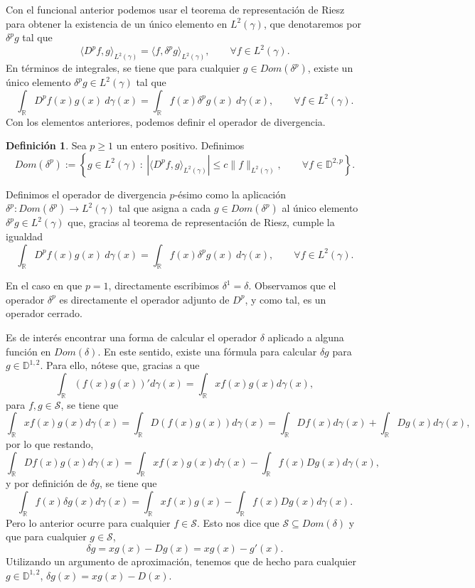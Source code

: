 \documentclass[letterpaper,twoside,12pt]{book}
\newcommand{\R}{\mathbb{R}}
\newcommand{\D}{\mathbb{D}}
\newcommand{\1}{\mathds{1}}
\newcommand{\abs}[1]{\left\lvert #1 \right\rvert}
\theoremstyle{definition}
\newtheorem{dfn}{Definición}
\theoremstyle{definition}
\theoremstyle{definition}
\theoremstyle{definition}
\theoremstyle{definition}
\theoremstyle{definition}
\theoremstyle{definition}
\begin{document}
Con el funcional anterior podemos usar el teorema de representación de Riesz para obtener la existencia de un único elemento en $L^2(\gamma)$, que denotaremos por $\delta^{p}g$ tal que 
\[
\langle D^pf,g\rangle_{L^2(\gamma)}=\langle f,\delta^p g\rangle_{L^2(\gamma)}, \qquad \forall f\in L^2(\gamma).
\]
 En términos de integrales, se tiene que para cualquier $g\in Dom(\delta^p)$, existe un único elemento $\delta^p g\in L^2(\gamma)$ tal que 
 \[
  \int_\R D^{p}f(x) g(x) \ d\gamma(x)=\int_\R f(x)\delta^{p}g(x) \ d\gamma(x), \qquad \forall f\in L^2(\gamma).  
 \]
 Con los elementos anteriores, podemos definir el operador de divergencia.

 \begin{dfn}
    Sea $p\geq1$ un entero positivo. Definimos $$Dom(\delta^p):=\left\{g\in L^2(\gamma) \ : \ \abs{\langle D^{p}f,g\rangle_{L^2(\gamma)}}\leq c\|f\|_{L^2(\gamma)}, \qquad \forall f\in \D^{2,p}\right\}.$$ 

    Definimos el operador de divergencia $p$-ésimo como la aplicación $\delta^p:Dom(\delta^{p})\longrightarrow L^2(\gamma)$ tal que asigna a cada $g\in Dom(\delta^{p})$ al único elemento $\delta^{p} g\in L^2(\gamma)$ que, gracias al teorema de representación de Riesz, cumple la igualdad
        \[
        \int_\R D^{p}f(x)g(x) \ d\gamma(x)=\int_\R f(x)\delta^{p}g(x) \ d\gamma(x), \qquad \forall f\in L^2(\gamma).
       \]
 \end{dfn}
 En el caso en que $p=1$, directamente escribimos $\delta^1=\delta$. Observamos que el operador $\delta^p$ es directamente el operador adjunto de $D^{p}$, y como tal, es un operador cerrado.

Es de interés encontrar una forma de calcular el operador $\delta$ aplicado a alguna función en $Dom(\delta)$. En este sentido, existe una fórmula para calcular $\delta g$ para $g\in \D^{1,2}$. Para ello, nótese que, gracias a que 
\[
\int_\R (f(x)g(x))'d\gamma(x)=\int_\R xf(x)g(x)d\gamma(x), 
\]
para $f,g\in \mathcal{S}$, se tiene que 
\[
    \int_\R xf(x)g(x)d\gamma(x)=\int_\R D \left(f(x)g(x)\right) d\gamma(x)=\int_\R Df(x)d\gamma(x) +\int_\R Dg(x)d\gamma(x),
\]
por lo que restando, 
\[
    \int_\R Df(x)g(x)d\gamma(x)=\int_\R xf(x)g(x)d\gamma(x)-\int_\R f(x)Dg(x)d\gamma(x),
\]
y por definición de $\delta g$, se tiene que 
\[
\int_\R f(x)\delta g(x)d\gamma(x)=\int_\R xf(x)g(x)-\int_\R f(x)Dg(x)d\gamma(x).   
\]
Pero lo anterior ocurre para cualquier $f\in \mathcal{S}$. Esto nos dice que $\mathcal{S}\subseteq Dom(\delta)$ y que para cualquier $g\in \mathcal{S}$, 
\[
\delta g=xg(x)-Dg(x)=xg(x)-g'(x).    
\]
Utilizando un argumento de aproximación, tenemos que de hecho para cualquier $g\in \mathbb{D}^{1,2}$, $\delta g(x)=xg(x)-D(x)$.
\end{document}
